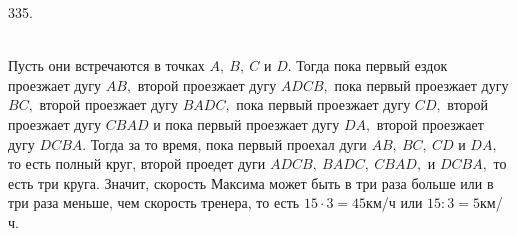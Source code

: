 335.\begin{figure}[ht!]
\end{figure}\\
Пусть они встречаются в точках $A,\ B,\ C$ и $D.$ Тогда пока первый ездок проезжает дугу $AB,$ второй проезжает дугу $ADCB,$ пока первый проезжает дугу $BC,$ второй проезжает дугу $BADC,$ пока первый проезжает дугу $CD,$ второй проезжает дугу $CBAD$ и пока первый проезжает дугу $DA,$ второй проезжает дугу $DCBA.$ Тогда за то время, пока первый проехал дуги $AB,\ BC,\ CD$ и $DA,$ то есть полный круг, второй проедет дуги $ADCB,\ BADC,\ CBAD,$ и $DCBA,$ то есть три круга. Значит, скорость Максима может быть в три раза больше или в три раза меньше, чем скорость тренера, то есть $15\cdot3=45$км/ч или $15:3=5$км/ч.\\
